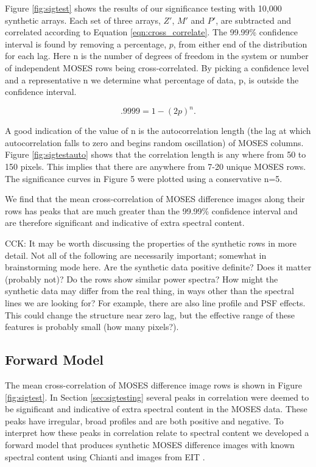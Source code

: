 \documentclass[]{solarphysics}
\newcommand{\cck}[1]{{\color{red} CCK: #1}} %
\begin{document}
\begin{article}
	Figure \ref{fig:sigtest} shows the results of our significance testing with 10,000 synthetic arrays.  Each set of three arrays, $Z'$, $M'$ and $P'$, are subtracted and correlated according to Equation \ref{eqn:cross_correlate}. The 99.99\% confidence interval is found by removing a percentage, $p$, from either end of the distribution for each lag. Here n is the number of degrees of freedom in the system or number of independent MOSES rows being cross-correlated.  By picking a confidence level and a representative n we determine what percentage of data, p, is outside the confidence interval.
	
	\begin{equation}
	.9999 = 1-(2p)^n.
	\end{equation}
	
	A good indication of the value of n is the autocorrelation length (the lag at which autocorrelation falls to zero and begins random oscillation) of MOSES columns.  Figure \ref{fig:sigtestauto} shows that the correlation length is any where from 50 to 150 pixels. This implies that there are anywhere from 7-20 unique MOSES rows.  The significance curves in Figure 5 were plotted using a conservative n=5. 
	
	 We find that the mean cross-correlation of MOSES difference images along their rows has peaks that are much greater than the 99.99\% confidence interval and are therefore significant and indicative of extra spectral content. 
	
	\cck{It may be worth discussing the properties of the synthetic rows in more detail. Not all of the following are necessarily important; somewhat in brainstorming mode here. Are the synthetic data positive definite? Does it matter (probably not)? Do the rows show similar power spectra? How might the synthetic data may differ from the real thing, in ways other than the spectral lines we are looking for? For example, there are also line profile and PSF effects. This could change the structure near zero lag, but the effective range of these features is probably small (how many pixels?). } 
	
	
	\subsection{Forward Model} 
	The mean cross-correlation of MOSES difference image rows is shown in Figure \ref{fig:sigtest}.  In Section \ref{sec:sigtesting} several peaks in correlation were deemed to be significant and indicative of extra spectral content in the MOSES  data.  These peaks have irregular, broad profiles and are both positive and negative.  To interpret how these peaks in correlation relate to spectral content we developed a forward model that produces synthetic MOSES difference images with known spectral content using Chianti \citep{} and images from EIT \citep{}.  
	


\end{article}
\end{document}
